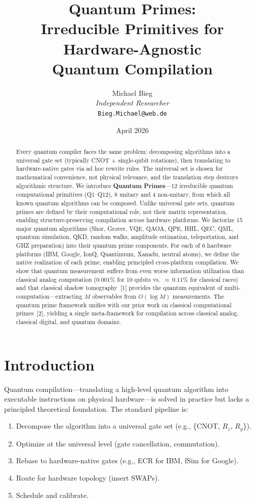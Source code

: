 \documentclass[11pt]{article}
\title{Quantum Primes:\\Irreducible Primitives for Hardware-Agnostic\\Quantum Compilation}
\author{Michael Bieg\\
\textit{Independent Researcher}\\
\texttt{Bieg.Michael@web.de}}
\date{April 2026}
\begin{document}
\maketitle

\begin{abstract}
Every quantum compiler faces the same problem: decomposing algorithms into a universal gate set (typically CNOT $+$ single-qubit rotations), then translating to hardware-native gates via ad hoc rewrite rules. The universal set is chosen for mathematical convenience, not physical relevance, and the translation step destroys algorithmic structure. We introduce \textbf{Quantum Primes}---12 irreducible quantum computational primitives (Q1--Q12), 8 unitary and 4 non-unitary, from which all known quantum algorithms can be composed. Unlike universal gate sets, quantum primes are defined by their computational role, not their matrix representation, enabling structure-preserving compilation across hardware platforms. We factorize 15 major quantum algorithms (Shor, Grover, VQE, QAOA, QPE, HHL, QEC, QML, quantum simulation, QKD, random walks, amplitude estimation, teleportation, and GHZ preparation) into their quantum prime components. For each of 6 hardware platforms (IBM, Google, IonQ, Quantinuum, Xanadu, neutral atoms), we define the native realization of each prime, enabling principled cross-platform compilation. We show that quantum measurement suffers from even worse information utilization than classical analog computation ($0.001\%$ for 10 qubits vs.\ ${\approx}\,0.11\%$ for classical races) and that classical shadow tomography~[1] provides the quantum equivalent of multi-computation---extracting $M$ observables from $O(\log M)$ measurements. The quantum prime framework unifies with our prior work on classical computational primes~[2], yielding a single meta-framework for compilation across classical analog, classical digital, and quantum domains.
\end{abstract}

\section{Introduction}

Quantum compilation---translating a high-level quantum algorithm into executable instructions on physical hardware---is solved in practice but lacks a principled theoretical foundation. The standard pipeline is:

\begin{enumerate}[leftmargin=*]
\item Decompose the algorithm into a universal gate set (e.g., \{CNOT, $R_z$, $R_y$\}).
\item Optimize at the universal level (gate cancellation, commutation).
\item Rebase to hardware-native gates (e.g., ECR for IBM, fSim for Google).
\item Route for hardware topology (insert SWAPs).
\item Schedule and calibrate.
\end{enumerate}
\end{document}
